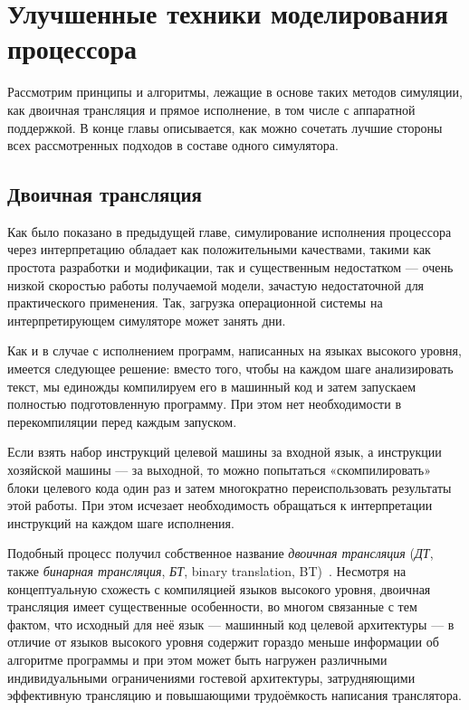 \chapter{Улучшенные техники моделирования процессора}\label{bt}



Рассмотрим принципы и алгоритмы, лежащие в основе таких методов симуляции, как двоичная трансляция и прямое исполнение, в том числе с аппаратной поддержкой. В конце главы описывается, как можно сочетать лучшие стороны всех рассмотренных подходов в составе одного симулятора.

\section{Двоичная трансляция}

Как было показано в предыдущей главе, симулирование исполнения процессора через интерпретацию обладает как положительными качествами, такими как простота разработки и модификации, так и существенным недостатком --- очень низкой скоростью работы получаемой модели, зачастую недостаточной для практического применения. Так, загрузка операционной системы на интерпретирующем симуляторе может занять дни.

Как и в случае с исполнением программ, написанных на языках высокого уровня, имеется следующее решение: вместо того, чтобы на каждом шаге анализировать текст, мы единожды компилируем его в машинный код и затем запускаем полностью подготовленную программу. При этом нет необходимости в перекомпиляции перед каждым запуском.

Если взять набор инструкций целевой машины за входной язык, а инструкции хозяйской машины --- за выходной, то можно попытаться «скомпилировать» блоки целевого кода один раз и затем многократно переиспользовать результаты этой работы. При этом исчезает необходимость обращаться к интерпретации инструкций на каждом шаге исполнения.

Подобный процесс получил собственное название \textit{двоичная трансляция} (\textit{ДТ}, также \textit{бинарная трансляция}, \textit{БТ}, \abbr binary translation, BT)~\cite{bt1993}. Несмотря на концептуальную схожесть с компиляцией языков высокого уровня, двоичная трансляция имеет существенные особенности, во многом связанные с тем фактом, что исходный для неё язык --- машинный код целевой архитектуры --- в отличие от языков высокого уровня содержит гораздо меньше информации об алгоритме программы и при этом может быть нагружен различными индивидуальными ограничениями гостевой архитектуры, затрудняющими эффективную трансляцию и повышающими трудоёмкость написания транслятора.

